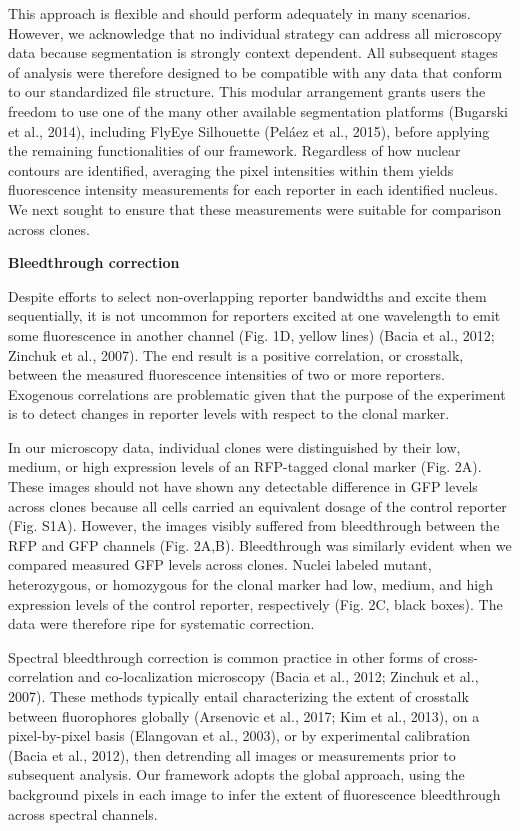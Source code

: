 This approach is flexible and should perform adequately in many scenarios. However, we acknowledge that no individual strategy can address all microscopy data because segmentation is strongly context dependent. All subsequent stages of analysis were therefore designed to be compatible with any data that conform to our standardized file structure. This modular arrangement grants users the freedom to use one of the many other available segmentation platforms (Bugarski et al., 2014), including FlyEye Silhouette (Peláez et al., 2015), before applying the remaining functionalities of our framework. Regardless of how nuclear contours are identified, averaging the pixel intensities within them yields fluorescence intensity measurements for each reporter in each identified nucleus. We next sought to ensure that these measurements were suitable for comparison across clones.

\textbf{Bleedthrough correction}

Despite efforts to select non-overlapping reporter bandwidths and excite them sequentially, it is not uncommon for reporters excited at one wavelength to emit some fluorescence in another channel (Fig. 1D, yellow lines) (Bacia et al., 2012; Zinchuk et al., 2007). The end result is a positive correlation, or crosstalk, between the measured fluorescence intensities of two or more reporters. Exogenous correlations are problematic given that the purpose of the experiment is to detect changes in reporter levels with respect to the clonal marker.

In our microscopy data, individual clones were distinguished by their low, medium, or high expression levels of an RFP-tagged clonal marker (Fig. 2A). These images should not have shown any detectable difference in GFP levels across clones because all cells carried an equivalent dosage of the control reporter (Fig. S1A). However, the images visibly suffered from bleedthrough between the RFP and GFP channels (Fig. 2A,B). Bleedthrough was similarly evident when we compared measured GFP levels across clones. Nuclei labeled mutant, heterozygous, or homozygous for the clonal marker had low, medium, and high expression levels of the control reporter, respectively (Fig. 2C, black boxes). The data were therefore ripe for systematic correction.

Spectral bleedthrough correction is common practice in other forms of cross-correlation and co-localization microscopy (Bacia et al., 2012; Zinchuk et al., 2007). These methods typically entail characterizing the extent of crosstalk between fluorophores globally (Arsenovic et al., 2017; Kim et al., 2013), on a pixel-by-pixel basis (Elangovan et al., 2003), or by experimental calibration (Bacia et al., 2012), then detrending all images or measurements prior to subsequent analysis. Our framework adopts the global approach, using the background pixels in each image to infer the extent of fluorescence bleedthrough across spectral channels.

